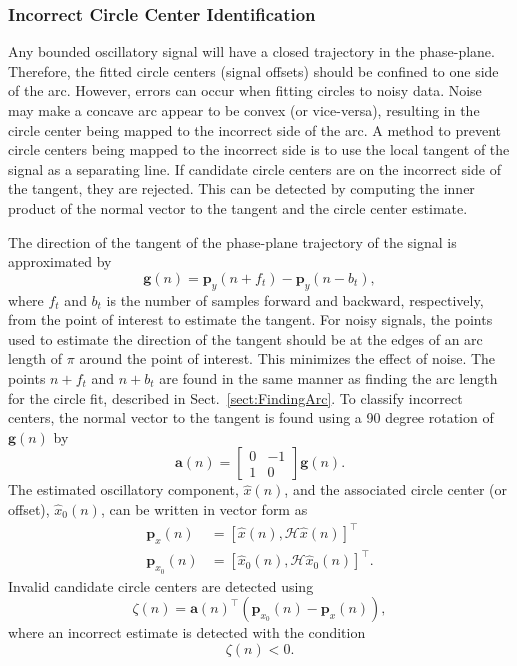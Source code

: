 \documentclass[a4paper]{IEEEtran}
\begin{document}
\subsubsection{Incorrect Circle Center Identification}
Any bounded oscillatory signal will have a closed trajectory in the phase-plane. Therefore, the fitted circle centers (signal offsets) should be confined to one side of the arc. However, errors can occur when fitting circles to noisy data. Noise may make a concave arc appear to be convex (or vice-versa), resulting in the circle center being mapped to the incorrect side of the arc. A method to prevent circle centers being mapped to the incorrect side is to use the local tangent of the signal as a separating line. If candidate circle centers are on the incorrect side of the tangent, they are rejected. This can be detected by computing the inner product of the normal vector to the tangent and the circle center estimate. 

The direction of the tangent of the phase-plane trajectory of the signal is approximated by 
\begin{equation}
	\mathbf{g}(n) = \mathbf{p}_y(n + f_t) - \mathbf{p}_y(n - b_t),
\end{equation}
where $f_t$ and $b_t$ is the number of samples forward and backward, respectively, from the point of interest to estimate the tangent. For noisy signals, the points used to estimate the direction of the tangent should be at the edges of an arc length of $\pi$ around the point of interest. This minimizes the effect of noise. The points $n+f_t$ and $n+b_t$ are found in the same manner as finding the arc length for the circle fit, described in Sect.~\ref{sect:FindingArc}. To classify incorrect centers, the normal vector to the tangent is found using a 90 degree rotation of $\mathbf{g}(n)$ by
\begin{equation}
	\mathbf{a}\left(n\right) = \left[\begin{array}{cc}
	0 & -1 \\
	1 & 0\end{array}\right]\mathbf{g}(n).
\end{equation}
The estimated oscillatory component, $\hat{x}(n)$, and the associated circle center (or offset), $\hat{x}_0(n)$, can be written in vector form as
\begin{align}
	\mathbf{p}_x(n) &= \left[\hat{x}\left(n\right),\mathcal{H}\hat{x}\left(n\right)\right]^{\top} \\ 
	\mathbf{p}_{x_0}\left(n\right) &= \left[\hat{x}_0\left(n\right), \mathcal{H}\hat{x}_0\left(n\right)\right]^{\top}. 
\end{align}
Invalid candidate circle centers are detected using 
\begin{equation}
    \zeta(n) = \mathbf{a}\left( n\right)^{\top}\left( \mathbf{p}_{x_0}\left( n \right) - \mathbf{p}_x\left( n\right) \right),
\end{equation}
where an incorrect estimate is detected with the condition
\begin{equation}\label{eq:IncorrectSideClassifier}
    \zeta(n) < 0.
\end{equation} 
\end{document}

